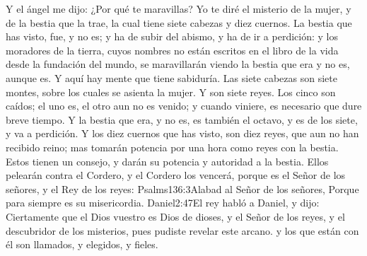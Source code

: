 Y el ángel me dijo: ¿Por qué te maravillas? Yo te diré el misterio de la mujer, y de la bestia que la trae, la cual tiene siete cabezas y diez cuernos. 
La bestia que has visto, fue, y no es; y ha de subir del abismo, y ha de ir a perdición: y los moradores de la tierra, cuyos nombres no están escritos en el libro de la vida desde la fundación del mundo, se maravillarán viendo la bestia que era y no es, aunque es. 
Y aquí hay mente que tiene sabiduría. Las siete cabezas son siete montes, sobre los cuales se asienta la mujer. 
Y son siete reyes. Los cinco son caídos; el uno es, el otro aun no es venido; y cuando viniere, es necesario que dure breve tiempo. 
Y la bestia que era, y no es, es también el octavo, y es de los siete, y va a perdición. 
Y los diez cuernos que has visto, son diez reyes,%
 que aun no han recibido reino; mas tomarán potencia por una hora como reyes con la bestia. 
Estos tienen un consejo, y darán su potencia y autoridad a la bestia. 
Ellos pelearán contra el Cordero, y el Cordero los vencerá, porque es el Señor de los señores, y el Rey de los reyes:%
				  {Psalms}{136:3}{Alabad al Señor de los señores, Porque para siempre es su misericordia.}%
				   {Daniel}{2:47}{El rey habló a Daniel, y dijo: Ciertamente que el Dios vuestro es Dios de dioses, y el Señor de los reyes, y el descubridor de los misterios, pues pudiste revelar este arcano.}
 y los que están con él son llamados, y elegidos, y fieles. 

